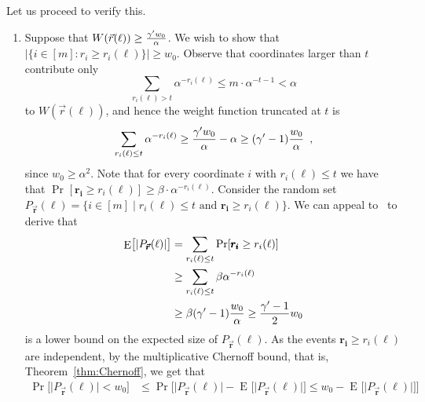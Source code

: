 \documentclass{article}
\providecommand{\abs}[1]{\lvert#1\rvert}
\DeclareMathOperator{\Expop}{E}
\newcommand{\Prob}[2][]{\Pr_{#1} \bigl[ #2 \bigr]}
\newcommand{\prob}[2][]{\Pr_{#1} [ #2 ]}
\newcommand{\Expectation}[2][]{\Expop_{#1} \bigl[ #2 \bigr]}
\newcommand{\set}[1]{\{ #1 \}}
\newcommand{\setdescr}[3][\mid]{\set{ #2 #1 #3 }}
\newcommand{\setsize}[1]{\lvert#1\rvert}
\newcommand{\eqcomma}{\enspace ,}
\newcommand{\refthm}[1]{Theorem~\ref{#1}}
\newcommand{\cgammap}{\ensuremath \gamma'}
\newcommand{\indexvec}{\ell}
\newcommand{\ri}[1]{r_{#1}}
\newcommand{\riof}[2]{r_{#2}(#1)}
\newcommand{\vecr}{\vec{r}}
\newcommand{\vecrof}[1]{\vec{r}(#1)}
\newcommand{\limval}{t}
\newcommand{\vecrb}{\pmb{\vecr}}
\newcommand{\rbi}[1]{\pmb{r_#1}}
\newcommand{\goodset}[2][\vecrb]{P_{#1}(#2)}
\numberwithin{equation}{section}
\begin{document}
{Let us  proceed to verify this.
  \begin{enumerate}
  \item 
    Suppose that 
    $W(\vecrof{\indexvec}) \ge \frac{ \cgammap w_0}{ \alpha}$. 
    We wish to show     that 
    $\setsize{ \setdescr[:]{ i \in [m] }{ \ri{i} \ge \riof{\indexvec}{i} } }
    \ge w_0$.
    Observe that 
    coordinates larger than $\limval$ contribute only
    \begin{equation}
      \sum_{\riof{\indexvec}{i} > \limval}{\alpha^{-\riof{\indexvec}{i}}} \le 
      m \cdot \alpha^{-\limval-1} < \alpha
    \end{equation}
to $W(\vecrof{\indexvec})$,
    and hence the weight function  truncated at $\limval$ is
    \begin{equation}
      \label{eq:truncated-weight}
      \sum_{\riof{\indexvec}{i} \le \limval} { \alpha^{-\riof{\indexvec}{i}} } \ge 
      \frac{ \cgammap w_0}{ \alpha } - \alpha \ge (\cgammap - 1)\frac{ w_0}{ \alpha } \eqcomma
  \end{equation}
  since $ w_0 \geq \alpha^2$.
  Note that for every coordinate $i$ with $\riof{\indexvec}{i} \le \limval$
  we have that 
  $\prob{\rbi{i} \ge \riof{\indexvec}{i}} \ge \beta \cdot \alpha^{-\riof{\indexvec}{i}}$.
  Consider the 
  random
  set
  $\goodset{\indexvec} = \set{ i \in [m] \mid 
    \riof{\indexvec}{i} \le \limval \text{ and } \rbi{i} \ge \riof{\indexvec}{i} }$. 
  We can appeal to~
  to derive  that 
\begin{align}
  \Expectation{ \setsize{ \goodset{\indexvec} } } 
  &=
  \sum_{\riof{\indexvec}{i} \le \limval}
  \prob{\rbi{i} \ge \riof{\indexvec}{i}}\nonumber\\
  &\geq 
  \sum_{\riof{\indexvec}{i} \le \limval}
  \beta
  { \alpha^{-\riof{\indexvec}{i}} } \nonumber\\
  &\geq
  \beta (\cgammap - 1) \frac{ w_0}{ \alpha }
  \geq
  \frac{\cgammap - 1}{2} w_0 
\end{align}
is  a lower bound  on the expected size of $\goodset{\indexvec}$.
As the events $\rbi{i} \ge \riof{\indexvec}{i}$ are independent, by
the multiplicative Chernoff bound, that is, \refthm{thm:Chernoff}, we
get that
\begin{subequations}
\begin{align}
  \Prob{\abs{ \goodset{\indexvec} } < w_0} 
  &\le
  \Prob{ \setsize{ \goodset{\indexvec} } - 
  \Expectation{ \setsize{ \goodset{\indexvec} } } \le w_0  - \Expectation{ \setsize{ \goodset{\indexvec} } } }\\

\end{align}
\end{subequations}
\end{enumerate}}
\end{document}
